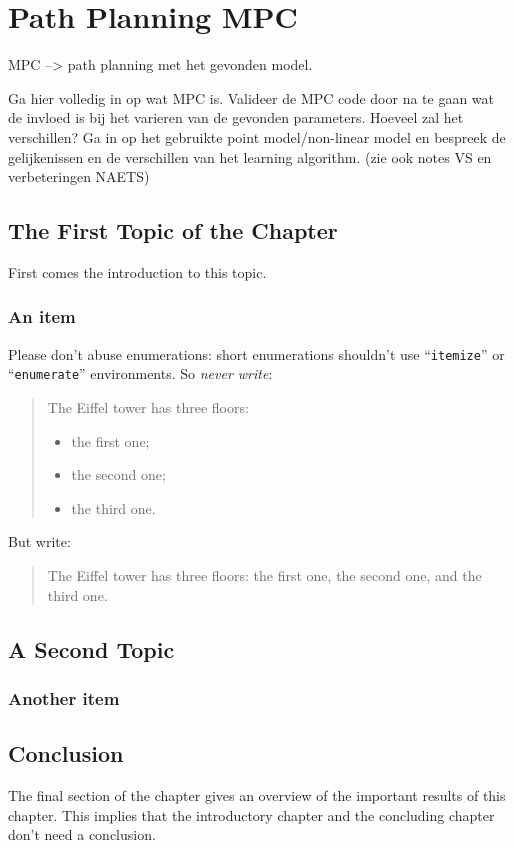 \chapter{Path Planning MPC}
\label{cha:3}

MPC --> path planning met het gevonden model.

Ga hier volledig in op wat MPC is.
Valideer de MPC code door na te gaan wat de invloed is bij het varieren van de gevonden parameters.
Hoeveel zal het verschillen? Ga in op het gebruikte point model/non-linear model en bespreek de gelijkenissen en de verschillen van het learning algorithm. (zie ook notes VS en verbeteringen NAETS)





\section{The First Topic of the Chapter}
First comes the introduction to this topic.



\subsection{An item}
Please don't abuse enumerations: short enumerations shouldn't use
``\verb|itemize|'' or ``\texttt{enumerate}'' environments.
So \emph{never write}: 
\begin{quote}
	The Eiffel tower has three floors:
	\begin{itemize}
		\item the first one;
		\item the second one;
		\item the third one.
	\end{itemize}
\end{quote}
But write:
\begin{quote}
	The Eiffel tower has three floors: the first one, the second one, and the
	third one.
\end{quote}

\section{A Second Topic}


\subsection{Another item}


\section{Conclusion}
The final section of the chapter gives an overview of the important results
of this chapter. This implies that the introductory chapter and the
concluding chapter don't need a conclusion.
